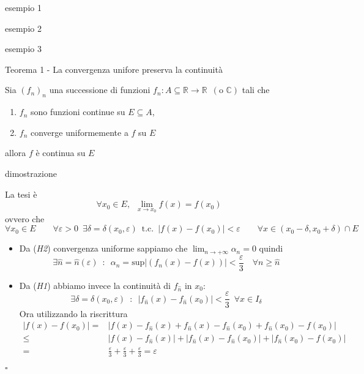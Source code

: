 \documentclass[x11names]{article}
\newcommand*{\QEDB}{\null\nobreak\hfill\ensuremath{\square}}%
\newcommand{\esempio}[2]{
	\begin{es}{esempio #1}
		#2
	\end{es}
}
\newcommand{\teorema}[2]{
	\begin{center}
		\fboxsep11pt
		\colorbox{myred}{\begin{minipage}{5.75in}
				\begin{redes}{#1}
					#2
				\end{redes}
		\end{minipage}}
	\end{center}
}
\newcommand{\dimostrazione}[2]{
	\begin{dym}{dimostrazione#1}
		#2
		\QEDB
	\end{dym}
}
\begin{document}
\esempio{1}{}
\esempio{2}{}
\esempio{3}{}



\teorema{Teorema 1 - La convergenza unifore preserva la continuità}{
Sia \((f_{n})_{n}\) una successione di funzioni \(f_{n}:A\subseteq \mathbb{R}\to \mathbb{R} \;\ (\text{o } \mathbb{C})\) tali che
\begin{enumerate}[start=1,label={(\itshape H\arabic*)}]
	\item \(f_{n}\) sono funzioni continue su \(E\subseteq A\),
	\item \(f_{n}\) converge uniformemente a \(f\) su \(E\)
\end{enumerate}
allora \(f\) è continua su \(E\)
}
\dimostrazione{}{
La tesi è 
\[ 
\forall x_{0} \in E, \;\ \lim_{x\to x_{0}} f(x) = f(x_{0})
\]
ovvero che
\[ 
\forall x_{0} \in E \qquad \forall \varepsilon > 0 \;\ \exists \delta = \delta(x_{0},\varepsilon) \;\ \text{t.c.} \;\ |f(x) - f(x_{0})| < \varepsilon \qquad \forall x \in (x_{0}-\delta,x_{0}+\delta) \cap E 
\]
\begin{itemize}
	\item Da (\textit{H2}) convergenza uniforme sappiamo che \( \lim_{n\to + \infty} \alpha _{n} = 0\) quindi 
	\[\exists \hat{n} = \hat{n}(\varepsilon) \;\ : \;\ \alpha_{n} = \text{sup}|(f_{n}(x) - f(x))| < \frac{\varepsilon}{3} \quad \forall n\geq\hat{n}
	\]
	\item Da (\textit{H1}) abbiamo invece la continuità di \(f_{\hat{n}}\) in \(x_{0}\):
	\[ 
	\exists \delta = \delta(x_{0},\varepsilon) \;\ : \;\ | f_{\hat{n}}(x) - f_{\hat{n}}(x_{0}) | < \frac{\varepsilon}{3} \;\ \forall x \in I_{\delta}
 	\]
 	Ora utilizzando la riscrittura
 	\begin{align*}
 		| f(x) - f(x_{0}) |  =& | f(x) - f_{\hat{n}}(x) + f_{\hat{n}}(x)  - f_{\hat{n}}(x_{0}) + f_{\hat{n}}(x_{0}) - f(x_{0})| \\
 		\leq & |f(x) - f_{\hat{n}}(x)| + |f_{\hat{n}}(x) -f_{\hat{n}}(x_{0})| + |f_{\hat{n}}(x_{0}) - f(x_{0})| \\
 		= & \frac{\varepsilon}{3} + \frac{\varepsilon}{3} + \frac{\varepsilon}{3}  = \varepsilon
 	\end{align*}
\end{itemize} }
\end{document}
